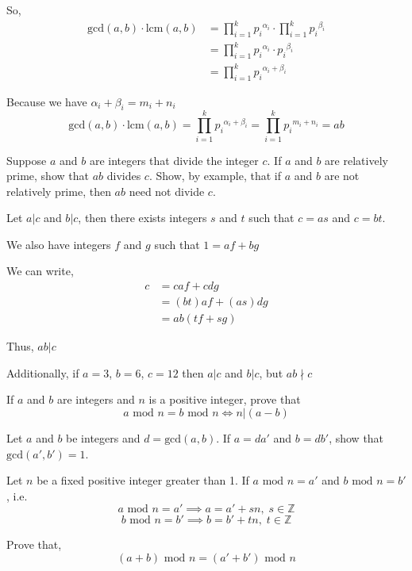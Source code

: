 \documentclass[11pt,largemargins]{homework}
\begin{document}
\quad So,
\begin{align*}
    \text{gcd}(a,b)\cdot\text{lcm}(a,b) &= \prod_{i=1}^k {p_i}^{\alpha_i} \cdot \prod_{i=1}^k {p_i}^{\beta_i}\\
                                        &= \prod_{i=1}^k {p_i}^{\alpha_i}\cdot{p_i}^{\beta_i}\\
                                        &= \prod_{i=1}^k {p_i}^{\alpha_i + \beta_i}
\end{align*}

\quad Because we have $\alpha_i + \beta_i = m_i + n_i$
$$\text{gcd}(a,b)\cdot\text{lcm}(a,b) = \prod_{i=1}^k {p_i}^{\alpha_i + \beta_i} = \prod_{i=1}^k {p_i}^{m_i + n_i} = ab$$

\question 
Suppose $a$ and $b$ are integers that divide the integer $c$. If $a$ and $b$ are relatively prime, show that $ab$ divides $c$. 
Show, by example, that if $a$ and $b$ are not relatively prime, then $ab$ need not divide $c$. 

\quad Let $a|c$ and $b|c$, then there exists integers $s$ and $t$ such that $c = as$ and $c = bt$.

\quad We also have integers $f$ and $g$ such that $1= af + bg$

\quad We can write,
\begin{align*}
    c &= caf + cdg\\
      &= (bt)af + (as)dg\\
      &= ab(tf+sg)
\end{align*}

\quad Thus, $ab | c$

\quad Additionally, if $a=3$, $b=6$, $c=12$ then $a|c$ and $b|c$, but $ab\nmid c$

\question 
If $a$ and $b$ are integers and $n$ is a positive integer, prove that 
$$a \text{ mod } n = b \text{ mod } n \iff n | (a-b)$$

\question 
Let $a$ and $b$ be integers and $d = \text{gcd}(a,b)$. If $a=da'$ and $b=db'$, show that $\text{gcd}(a',b')=1$.

\question 
Let $n$ be a fixed positive integer greater than 1. If $a\text{ mod }n=a'$ and $b\text{ mod }n=b'$, i.e. 
$$a\text{ mod }n=a' \implies a=a'+sn, \;s\in\mathbb{Z}$$
$$b\text{ mod }n=b' \implies b=b'+tn, \;t\in\mathbb{Z}$$

Prove that,
\begin{equation}\tag{0.11a}
    (a+b)\text{ mod }n = (a'+b')\text{ mod }n 
\end{equation}
\end{document}
